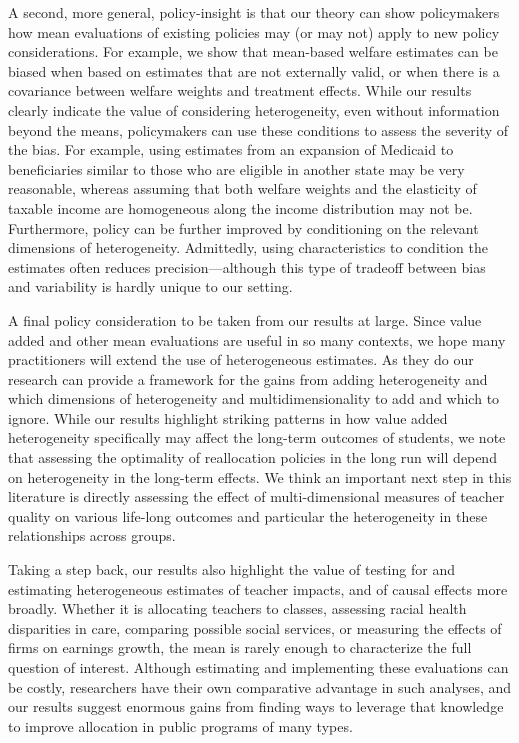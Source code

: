 \documentclass[12pt]{article}
\theoremstyle{definition}
\theoremstyle{definition}
\theoremstyle{definition}
\theoremstyle{definition}
\begin{document}
A second,  more general, policy-insight is that our theory can show policymakers how mean evaluations of existing policies may (or may not) apply to new policy considerations. For example, we show that mean-based welfare estimates can be biased when based on estimates that are not externally valid, or when there is a covariance between welfare weights and treatment effects. While our results clearly indicate the value of considering heterogeneity, even without information beyond the means, policymakers can use these conditions to assess the severity of the bias. For example, using estimates from an expansion of Medicaid to beneficiaries similar to those who are eligible in another state may be very reasonable, whereas assuming that both welfare weights and the elasticity of taxable income are homogeneous along the income distribution may not be. Furthermore, policy can be further improved by conditioning on the relevant dimensions of heterogeneity. Admittedly, using characteristics to condition the estimates often reduces precision---although this type of tradeoff between bias and variability is hardly unique to our setting.


A final policy consideration to be taken from our results at large. Since value added and other mean evaluations are useful in so many contexts, we hope many practitioners will extend the use of heterogeneous estimates. As they do our research can provide a framework for the gains from adding heterogeneity and which dimensions of heterogeneity and multidimensionality to add and which to ignore. While our results highlight striking patterns in how value added heterogeneity specifically may affect the long-term outcomes of students, we note that assessing the optimality of reallocation policies in the long run will depend on heterogeneity in the long-term effects. We think an important next step in this literature is directly assessing the effect of multi-dimensional measures of teacher quality on various life-long outcomes and particular the heterogeneity in these relationships across groups. 

Taking a step back, our results also highlight the value of testing for and estimating heterogeneous estimates of teacher impacts, and of causal effects more broadly. Whether it is allocating teachers to classes, assessing racial health disparities in care, comparing possible social services, or measuring the effects of firms on earnings growth, the mean is rarely enough to characterize the full question of interest. Although estimating and implementing these evaluations can be costly, researchers have their own comparative advantage in such analyses, and our results suggest enormous gains from finding ways to leverage that knowledge to improve allocation in public programs of many types.
\end{document}
